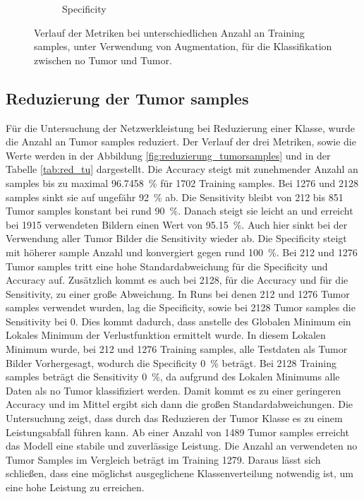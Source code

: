 \begin{figure}[H]
\begin{subfigure}[b]{0.48\textwidth}
    \caption{Specificity}
    \label{fig:augmentation_specificity}
  \end{subfigure}
  \caption{Verlauf der Metriken bei unterschiedlichen Anzahl an Training samples, unter Verwendung von Augmentation, für die Klassifikation zwischen no Tumor und Tumor.}
  \label{fig:augmentation_tu}
\end{figure}

\subsection{Reduzierung der Tumor samples}
Für die Untersuchung der Netzwerkleistung bei Reduzierung einer Klasse, wurde die Anzahl an Tumor samples reduziert.
Der Verlauf der drei Metriken, sowie die Werte werden in der Abbildung \ref{fig:reduzierung_tumorsamples} und in der Tabelle \ref{tab:red_tu} dargestellt.
Die Accuracy steigt mit zunehmender Anzahl an samples bis zu maximal \SI{96.7458}{\percent} für 1702 Training samples.
Bei 1276 und 2128 samples sinkt sie auf ungefähr \SI{92}{\percent} ab. 
Die Sensitivity bleibt von 212 bis 851 Tumor samples konstant bei rund \SI{90}{\%}.
Danach steigt sie leicht an und erreicht bei 1915 verwendeten Bildern einen Wert von \SI{95.15}{\%}.
Auch hier sinkt bei der Verwendung aller Tumor Bilder die Sensitivity wieder ab.
Die Specificity steigt mit höherer sample Anzahl und konvergiert gegen rund \SI{100}{\%}.
Bei 212 und 1276 Tumor samples tritt eine hohe Standardabweichung für die Specificity und Accuracy auf.
Zusätzlich kommt es auch bei 2128, für die Accuracy und für die Sensitivity, zu einer große Abweichung. 
In Runs bei denen 212 und 1276 Tumor samples verwendet wurden, lag die Specificity, 
sowie bei 2128 Tumor samples die Sensitivity bei 0.
Dies kommt dadurch, dass anstelle des Globalen Minimum ein Lokales Minimum der Verlustfunktion ermittelt wurde.
In diesem Lokalen Minimum wurde, bei 212 und 1276 Training samples, alle Testdaten als Tumor Bilder Vorhergesagt, wodurch die Specificity \SI{0}{\%} beträgt.
Bei 2128 Training samples beträgt die Sensitivity \SI{0}{\%}, da aufgrund des Lokalen Minimums alle Daten als no Tumor klassifiziert werden.
Damit kommt es zu einer geringeren Accuracy und im Mittel ergibt sich dann die großen Standardabweichungen.
Die Untersuchung zeigt, dass durch das Reduzieren der Tumor Klasse es zu einem Leistungsabfall führen kann.
Ab einer Anzahl von 1489 Tumor samples erreicht das Modell eine stabile und zuverlässige Leistung.
Die Anzahl an verwendeten no Tumor Samples im Vergleich beträgt im Training 1279. 
Daraus lässt sich schließen, dass eine möglichst ausgeglichene Klassenverteilung notwendig ist, um eine hohe Leistung zu erreichen.
